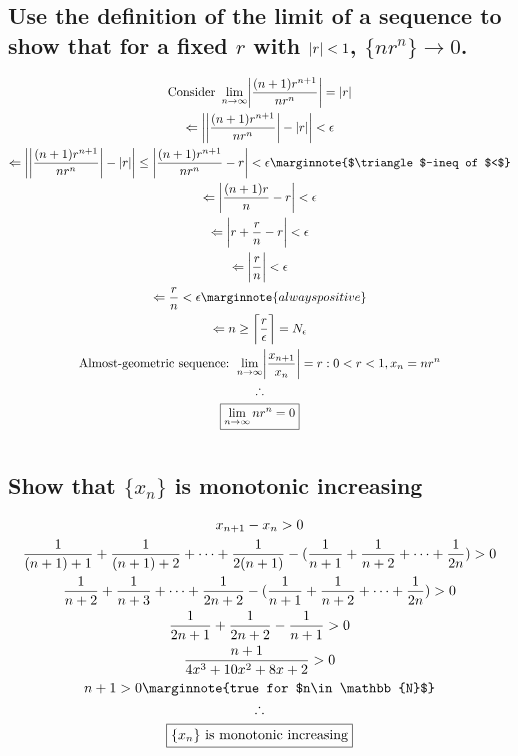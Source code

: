 \documentclass[letterpaper]{article}
\DeclarePairedDelimiter{\ceil}{\lceil}{\rceil}
\DeclarePairedDelimiter\abs{\lvert}{\rvert}
\begin{document}
\section{}
\subsection{Use the definition of the limit of a sequence to show that for a fixed $r$ with $\abs{r}<1$, $\{nr^n\}\rightarrow0$.}
\begin{gather*}
\text{Consider }\lim_{n\rightarrow\infty}\abs[\bigg]{\frac{(n+1)r^{n+1}}{nr^n}}=\abs{r} \\
\Leftarrow \abs[\bigg]{\abs[\bigg]{\frac{(n+1)r^{n+1}}{nr^n}}-\abs{r}}<\epsilon \\
\Leftarrow \abs[\bigg]{\abs[\bigg]{\frac{(n+1)r^{n+1}}{nr^n}}-\abs{r}}\leq\abs[\bigg]{\frac{(n+1)r^{n+1}}{nr^n}-r}<\epsilon \marginnote{$\triangle$-ineq of $<$} \\
\Leftarrow \abs[\bigg]{\frac{(n+1)r}{n}-r}<\epsilon \\
\Leftarrow \abs[\bigg]{r+\frac{r}{n}-r}<\epsilon \\
\Leftarrow \abs[\bigg]{\frac{r}{n}}<\epsilon \\
\Leftarrow \frac{r}{n}<\epsilon \marginnote{always positive} \\
\Leftarrow n\geq\ceil[\bigg]{\frac{r}{\epsilon}}=N_\epsilon \\
\text{Almost-geometric sequence: } \lim_{n\rightarrow\infty}\abs[\bigg]{\frac{x_{n+1}}{x_n}}=r:0<r<1,x_n=nr^n \\
\therefore \\
\boxed{\lim_{n\rightarrow\infty}nr^n=0}
\end{gather*}

\section{}

\section{}
\subsection{}
\subsection{Show that $\{x_n\}$ is monotonic increasing}
\begin{gather*}
x_{n+1}-x_n>0 \\
\frac{1}{(n+1)+1}+\frac{1}{(n+1)+2}+\dotsb+\frac{1}{2(n+1)}-(\frac{1}{n+1}+\frac{1}{n+2}+\dotsb+\frac{1}{2n})>0 \\
\frac{1}{n+2}+\frac{1}{n+3}+\dotsb+\frac{1}{2n+2}-(\frac{1}{n+1}+\frac{1}{n+2}+\dotsb+\frac{1}{2n})>0 \\
\frac{1}{2n+1}+\frac{1}{2n+2}-\frac{1}{n+1}>0 \\
\frac{n+1}{4x^3+10x^2+8x+2}>0 \\
n+1>0 \marginnote{true for $n\in\mathbb{N}$} \\
\therefore \\
\boxed{\{x_n\} \text{ is monotonic increasing}}
\end{gather*}
\end{document}
